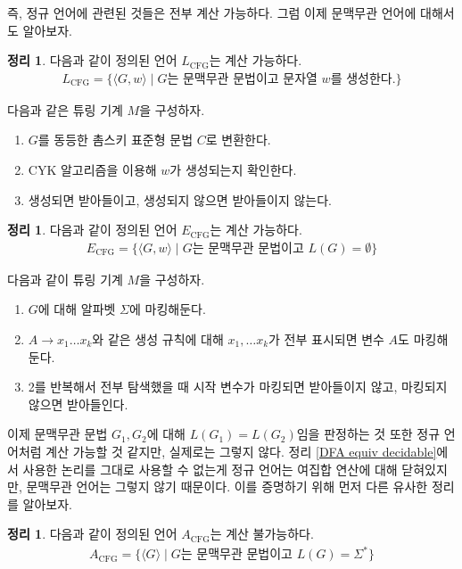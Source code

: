 \documentclass[b5paper, 11pt]{book}
\theoremstyle{definition}
\newtheorem{thm}[defn]{정리}
\newenvironment{pf*}{\pushQED{\qed}\pf}
{\popQED\endpf}
\begin{document}
즉, 정규 언어에 관련된 것들은 전부 계산 가능하다. 그럼 이제 문맥무관 언어에 대해서도
알아보자.
\begin{thm}
    다음과 같이 정의된 언어 $L_{\text{CFG}}$는 계산 가능하다.
    \begin{align*}
        L_{\text{CFG}} = \{\langle G, w \rangle \;\vert\; 
        G\text{는 문맥무관 문법이고 문자열 } w\text{를 생성한다.}\}
    \end{align*}
\end{thm}
\begin{pf*}
    다음과 같은 튜링 기계 $M$을 구성하자.
    \begin{enumerate}
        \item $G$를 동등한 촘스키 표준형 문법 $C$로 변환한다.
        \item CYK 알고리즘을 이용해 $w$가 생성되는지 확인한다.
        \item 생성되면 받아들이고, 생성되지 않으면 받아들이지 않는다.
    \end{enumerate}
\end{pf*}
\begin{thm}
    다음과 같이 정의된 언어 $E_\text{CFG}$는 계산 가능하다.
    \begin{align*}
        E_{\text{CFG}} = \{\langle G, w \rangle \;\vert\; 
        G\text{는 문맥무관 문법이고 } L(G) = \emptyset\}
    \end{align*}
\end{thm}
\begin{pf*}
    다음과 같이 튜링 기계 $M$을 구성하자.
    \begin{enumerate}
        \item $G$에 대해 알파벳 $\Sigma$에 마킹해둔다. 
        \item $A \rightarrow x_1 \ldots x_k$와 같은 생성 규칙에 대해 
        $x_1, \ldots x_k$가 전부 표시되면 변수 $A$도 마킹해둔다.
        \item 2를 반복해서 전부 탐색했을 때 시작 변수가 마킹되면 받아들이지 않고, 
        마킹되지 않으면 받아들인다. 
    \end{enumerate}
\end{pf*}
이제 문맥무관 문법 $G_1, G_2$에 대해 $L(G_1) = L(G_2)$임을 판정하는 것 또한
정규 언어처럼 계산 가능할 것 같지만, 실제로는 그렇지 않다. 정리 \ref{DFA equiv decidable}에서 사용한 논리를 그대로 사용할 수 없는게 정규 언어는 여집합 연산에 대해 닫혀있지만, 문맥무관 언어는 그렇지 않기 때문이다. 이를 증명하기 위해 먼저 다른 유사한 정리를 알아보자.
\begin{thm}
    \label{all CFG undecidable}
    다음과 같이 정의된 언어 $A_\text{CFG}$는 계산 불가능하다.
    \begin{align*}
        A_\text{CFG} = \{\langle G \rangle \;\vert\; G\text{는 문맥무관 문법이고 } L(G) = \Sigma^*\}
    \end{align*}
\end{thm}
\end{document}
